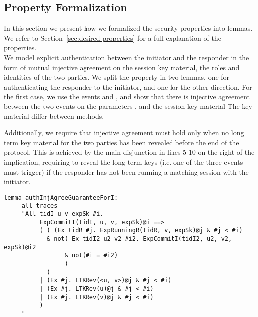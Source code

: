 \subsection{Property Formalization}
\label{sec:propertyFormalization}
In this section we present how we formalized the security properties into
\mTamarin{} lemmas.
%
We refer to Section~\ref{sec:desired-properties} for a full explanation of the
properties.
\\

We model explicit authentication between the initiator and the
responder in the form of mutual injective agreement on the session key material,
the roles and identities of the two parties.
%
We split the property in two lemmas, one for authenticating the responder to the
initiator, and one for the other direction.
%
For the first case, we use the events  and
, and show that there is injective agreement
between the two events on the parameters ,
 and the session key material 
%
The key material differ between \mEdhoc{} methods.
%

Additionally, we require that injective agreement must hold only when
no long term key material for the two parties has been revealed before
the end of the protocol.
%
This is achieved by the main disjunction in lines 5-10 on the right of
the implication, requiring to reveal the long term keys (i.e. one of
the three  events must trigger) if the responder has
not been running a matching session with the initiator.



\begin{lstlisting}
lemma authInjAgreeGuaranteeForI:
     all-traces
     "All tidI u v expSk #i.
          ExpCommitI(tidI, u, v, expSk)@i ==>
          ( ( (Ex tidR #j. ExpRunningR(tidR, v, expSk)@j & #j < #i)
            & not( Ex tidI2 u2 v2 #i2. ExpCommitI(tidI2, u2, v2, expSk)@i2
                 & not(#i = #i2)
                 )
            )
          | (Ex #j. LTKRev(<u, v>)@j & #j < #i)
          | (Ex #j. LTKRev(u)@j & #j < #i)
          | (Ex #j. LTKRev(v)@j & #j < #i)
          )
     "
\end{lstlisting}

